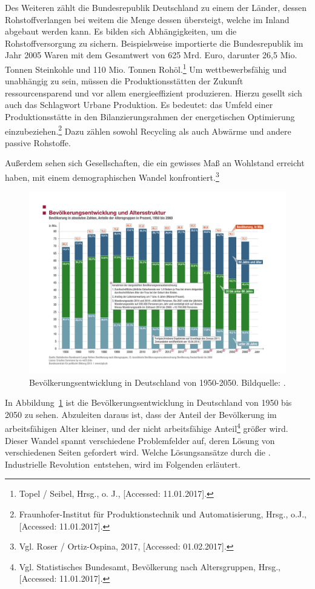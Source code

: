 Des Weiteren zählt die Bundesrepublik Deutschland zu einem der Länder, dessen Rohstoffverlangen bei weitem die Menge dessen übersteigt, welche im Inland abgebaut werden kann. Es bilden sich Abhängigkeiten, um die Rohstoffversorgung zu sichern. Beispielsweise importierte die Bundesrepublik im Jahr 2005 Waren mit dem Gesamtwert von 625 Mrd. Euro, darunter 26,5 Mio. Tonnen Steinkohle und 110 Mio. Tonnen Rohöl.\footnote{ Topel / Seibel, Hrsg., o. J., [Accessed: 11.01.2017].}
Um wettbewerbsfähig und unabhängig zu sein, müssen die Produktionsstätten der Zukunft ressourcensparend und vor allem energieeffizient produzieren.
Hierzu gesellt sich auch das Schlagwort \frqq Urbane Produktion\flqq. Es bedeutet: \glqq das Umfeld einer Produktionsstätte in den Bilanzierungsrahmen der energetischen Optimierung einzubeziehen\grqq.\footnote{ Fraunhofer-Institut für Produktionstechnik und Automatisierung, Hrsg., o.J., [Accessed: 11.01.2017].} Dazu zählen sowohl Recycling als auch Abwärme und andere passive Rohstoffe.

Außerdem sehen sich Gesellschaften, die ein gewisses Maß an Wohlstand erreicht haben, mit einem demographischen Wandel konfrontiert.\footnote{ Vgl. Roser / Ortiz-Ospina, 2017, [Accessed: 01.02.2017].}
\begin{figure}[ht]
	\centering
	\includegraphics[width=1.\textwidth]{figuren/SOZ_01_04_Bevoelkerungsentwicklung_und_Altersstruktur}
	\caption{Bevölkerungsentwicklung in Deutschland von 1950-2050. Bildquelle: \cite{demographischerWandel}.}
	\label{fig:DEDemographischerWandel}
\end{figure}
In Abbildung~\ref{fig:DEDemographischerWandel} ist die Bevölkerungsentwicklung in Deutschland von 1950 bis 2050 zu sehen. Abzuleiten daraus ist, dass der Anteil der Bevölkerung im arbeitsfähigen Alter kleiner, und der nicht arbeitsfähige Anteil\footnote{ Vgl. Statistisches Bundesamt, Bevölkerung nach Altersgruppen, Hrsg., [Accessed: 11.01.2017].} größer wird. Dieser Wandel spannt verschiedene Problemfelder auf, deren Lösung von verschiedenen Seiten gefordert wird. Welche Lösungsansätze durch die . Industrielle Revolution\flqq\ entstehen, wird im Folgenden erläutert.
